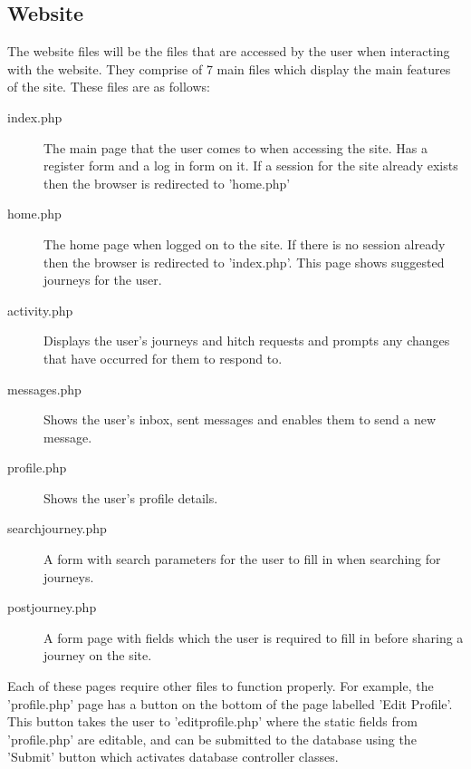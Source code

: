 \documentclass[11pt]{article}
\begin{document}
\subsection{Website}

The website files will be the files that are accessed by the user when interacting with the website. They comprise of 7 main files which display the main features of the site. These files are as follows:

\begin{description}
\item[index.php] The main page that the user comes to when accessing the site. Has a register form and a log in form on it.
If a session for the site already exists then the browser is redirected to 'home.php'
\item[home.php] The home page when logged on to the site. If there is no session already then the browser is redirected to 'index.php'. This page shows suggested journeys for the user.
\item[activity.php] Displays the user's journeys and hitch requests and prompts any changes that have occurred for them to respond to.
\item[messages.php] Shows the user's inbox, sent messages and enables them to send a new message.
\item[profile.php] Shows the user's profile details. 
\item[search\textunderscore journey.php] A form with search parameters for the user to fill in when searching for journeys.
\item[post\textunderscore journey.php] A form page with fields which the user is required to fill in before sharing a journey on the site.
\end{description}

Each of these pages require other files to function properly. For example, the 'profile.php' page has a button on the bottom of the page labelled 'Edit Profile'. This button takes the user to 'edit\textunderscore profile.php' where the static fields from 'profile.php' are editable, and can be submitted to the database using the 'Submit' button which activates database controller classes.
\end{document}
